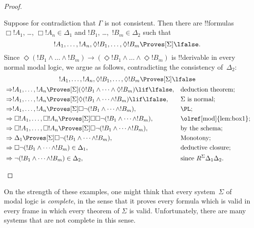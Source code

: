 \documentclass[../../../include/open-logic-section]{subfiles}
\begin{document}
\begin{proof}
\begin{enumerate}
    Suppose for contradiction that $\Gamma$ is not consistent. Then
    there are !!{formula}s $\Box!A_1$, \dots, $\Box!A_n \in \Delta_1$
    and $!B_1$, \dots,~$!B_m \in \Delta_2$ such that \[!A_1, \dots,
    !A_n, \Diamond!B_1, \dots, \Diamond!B_m \Proves[\Sigma]
    \lfalse.\] Since $\Diamond (!B_1 \land \dots \land !B_m) \to
    (\Diamond!B_1 \land \dots \land \Diamond!B_m)$ is !!{derivable} in
    every normal modal logic, we argue as follows, contradicting the
    consistency of~$\Delta_2$:
    \begin{multline*}
      !A_1, \dots, !A_n, \Diamond!B_1, \dots,
      \Diamond!B_m\Proves[\Sigma] \lfalse \\
    \begin{aligned}
      & \Rightarrow
      !A_1, \dots,!A_n \Proves[\Sigma] (\Diamond!B_1 \land
      \dots \land \Diamond!B_m) \lif \lfalse,
      && \text{deduction theorem;} \\
      & \Rightarrow !A_1, \dots,!A_n \Proves[\Sigma]
      \Diamond(!B_1 \land
      \dots \land !B_m) \lif \lfalse, && \Sigma \text{ is normal}; \\
      & \Rightarrow !A_1, \dots,!A_n \Proves[\Sigma]
      \Box \lnot (!B_1 \land \dots \land !B_m), && \text{\PL}; \\
      & \Rightarrow \Box!A_1, \dots,\Box!A_n
      \Proves[\Sigma] \Box\Box \lnot (!B_1 \land \dots \land !B_m), &&
      \text{\olref[mod]{lem:box1}}; \\
      & \Rightarrow \Box!A_1, \dots,\Box!A_n
      \Proves[\Sigma]
      \Box\lnot (!B_1 \land \dots \land !B_m), && \text{by the
        schema}; \\
      & \Rightarrow \Delta_1 \Proves[\Sigma]
      \Box\lnot (!B_1 \land \dots \land !B_m), && \text{Monotony}; \\
      & \Rightarrow 
      \Box\lnot (!B_1 \land \dots \land !B_m) \in \Delta_1, && \text{deductive closure}; \\
      & \Rightarrow 
      \lnot (!B_1 \land \dots \land !B_m) \in \Delta_2, && \text{since }
      R^\Sigma \Delta_1\Delta_2. 
    \end{aligned}
    \end{multline*}
  \end{enumerate}
\end{proof}

On the strength of these examples, one might think that every
system~$\Sigma$ of modal logic is \emph{complete}, in the sense that
it proves every formula which is valid in every frame in which every
theorem of $\Sigma$ is valid. Unfortunately, there are many systems
that are not complete in this sense.
\end{document}
